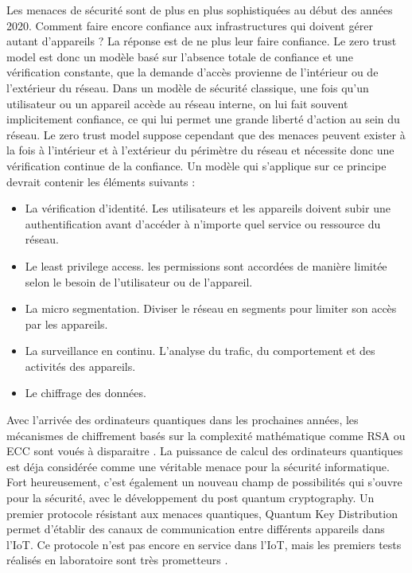 Les menaces de sécurité sont de plus en plus sophistiquées au début des années 2020. Comment faire encore confiance aux infrastructures qui doivent gérer autant d'appareils ? La réponse est de ne plus leur faire confiance. Le zero trust model est donc un modèle basé sur l'absence totale de confiance et une vérification constante, que la demande d'accès provienne de l'intérieur ou de l'extérieur du réseau. Dans un modèle de sécurité classique, une fois qu'un utilisateur ou un appareil accède au réseau interne, on lui fait souvent implicitement confiance, ce qui lui permet une grande liberté d'action au sein du réseau. Le zero trust model suppose cependant que des menaces peuvent exister à la fois à l’intérieur et à l’extérieur du périmètre du réseau et nécessite donc une vérification continue de la confiance. Un modèle qui s'applique sur ce principe devrait contenir les éléments suivants \cite{zero1} :
\begin{itemize}
\item La vérification d'identité. Les utilisateurs et les appareils doivent subir une authentification avant d'accéder à n'importe quel service ou ressource du réseau.
\item Le least privilege access. les permissions sont accordées de manière limitée selon le besoin de l'utilisateur ou de l'appareil.
\item La micro segmentation. Diviser le réseau en segments pour limiter son accès par les appareils.
\item La surveillance en continu. L'analyse du trafic, du comportement et des activités des appareils.
\item Le chiffrage des données.
\end{itemize}

\vspace{0.1cm}


Avec l'arrivée des ordinateurs quantiques dans les prochaines années, les mécanismes de chiffrement basés sur la complexité mathématique comme \ac{RSA} ou \ac{ECC} sont voués à disparaitre  \cite{quantumcrypto}. La puissance de calcul des ordinateurs quantiques est déja considérée comme une véritable menace pour la sécurité informatique. Fort heureusement, c'est également un nouveau champ de possibilités qui s'ouvre pour la sécurité, avec le développement du post quantum cryptography. Un premier protocole résistant aux menaces quantiques, Quantum Key Distribution permet d'établir des canaux de communication entre différents appareils dans l'\ac{IoT}. Ce protocole n'est pas encore en service dans l'\ac{IoT}, mais les premiers tests réalisés en laboratoire sont très prometteurs \cite{qinternet}.